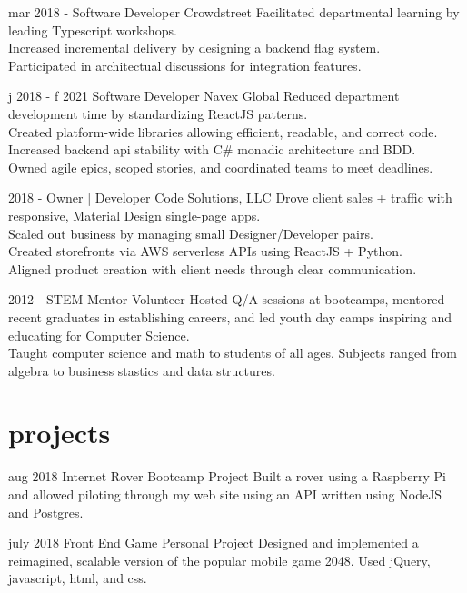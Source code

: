 \documentclass[]{friggeri-cv}
\begin{document}
\begin{entrylist}
  \entry 
    {mar 2018 - }
    {Software Developer}
    {Crowdstreet}
    {
    Facilitated departmental learning by leading Typescript workshops.\\
    Increased incremental delivery by designing a backend flag system. \\
    Participated in architectual discussions for integration features.
    }
  

  \entry 
    {j 2018 - f 2021}
    {Software Developer}
    {Navex Global}
    {
    Reduced department development time by standardizing ReactJS patterns.\\
    Created platform-wide libraries allowing efficient, readable, and correct code.\\
    Increased backend api stability with C\# monadic architecture and BDD.\\
    Owned agile epics, scoped stories, and coordinated teams to meet deadlines.
    }
  
  \entry 
    {2018 - }
    {Owner | Developer}
    {Code Solutions, LLC}
    {
    Drove client sales + traffic with responsive, Material Design single-page apps. \\
    Scaled out business by managing small Designer/Developer pairs.\\
    Created storefronts via AWS serverless APIs using ReactJS + Python. \\
    Aligned product creation with client needs through clear communication.}

 
  \entry
    {2012 -}
    {STEM Mentor Volunteer}
    {}
    {Hosted Q/A sessions at bootcamps, mentored recent graduates in establishing careers, and led youth day camps inspiring and educating for Computer Science.\\
    Taught computer science and math to students of all ages. Subjects ranged from algebra to business stastics and data structures.}

\end{entrylist}

\section{projects}

\begin{entrylist}

  \entry
    {aug 2018}
    {Internet Rover}
    {Bootcamp Project}
    {Built a rover using a Raspberry Pi and allowed piloting through my web site using an API written using NodeJS and Postgres.}

  \entry
    {july 2018}
    {Front End Game}
    {Personal Project}
    {Designed and implemented a reimagined, scalable version of the popular mobile game 2048. Used jQuery, javascript, html, and css.}

\end{entrylist}
\end{document}

